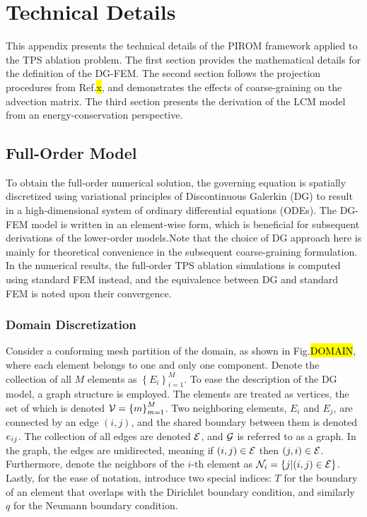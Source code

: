 \appendix

\section{Technical Details}\label{appendix}

This appendix presents the technical details of the PIROM framework applied to the TPS ablation problem. The first section provides the mathematical details for the definition of the DG-FEM. The second section follows the projection procedures from Ref.\hl{x}, and demonstrates the effects of coarse-graining on the advection matrix. The third section presents the derivation of the LCM model from an energy-conservation perspective.

\subsection{Full-Order Model}

To obtain the full-order numerical solution, the governing equation is spatially discretized using variational principles of Discontinuous Galerkin (DG) to result in a high-dimensional system of ordinary differential equations (ODEs). The DG-FEM model is written in an element-wise form, which is beneficial for subsequent derivations of the lower-order models.Note that the choice of DG approach here is mainly for theoretical convenience in the subsequent coarse-graining formulation. In the numerical results, the full-order TPS ablation simulations is computed using standard FEM instead, and the equivalence between DG and standard FEM is noted upon their convergence.

\subsubsection{Domain Discretization}

Consider a conforming mesh partition of the domain, as shown in Fig.\hl{DOMAIN}, where each element belongs to one and only one component. Denote the collection of all $M$ elements as $\left\{E_i\right\}_{i=1}^{M}$. To ease the description of the DG model, a graph structure is employed. The elements are treated as vertices, the set of which is denoted $\mathcal{V}=\left\{m\right\}_{m=1}^{M}$. Two neighboring elements, $E_i$ and $E_j$, are connected by an edge $(i,j)$, and the shared boundary between them is denoted $e_{ij}$. The collection of all edges are denoted $\mathcal{E}$, and $\mathcal{G}$ is referred to as a graph. In the graph, the edges are unidirected, meaning if $(i,j)\in\mathcal{E}$ then $(j,i)\in\mathcal{E}$. Furthermore, denote the neighbors of the $i$-th element as $\mathcal{N}_i=\left\{j | (i,j) \in\mathcal{E}\right\}$. Lastly, for the ease of notation, introduce two special indices: $T$ for the boundary of an element that overlaps with the Dirichlet boundary condition, and similarly $q$ for the Neumann boundary condition.


